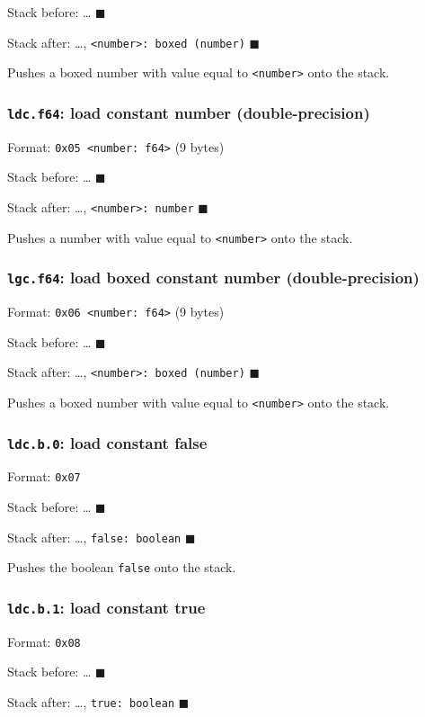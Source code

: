 Stack before: \ldots{} \(\blacksquare\)

Stack after: \ldots{}, \texttt{<number>: boxed (number)} \(\blacksquare\)

Pushes a boxed number with value equal to \texttt{<number>} onto the stack.

\subsubsection{\texttt{ldc.f64}: load constant number (double-precision)}
\label{sec:org6bba761}
Format: \texttt{0x05 <number: f64>} (9 bytes)

Stack before: \ldots{} \(\blacksquare\)

Stack after: \ldots{}, \texttt{<number>: number} \(\blacksquare\)

Pushes a number with value equal to \texttt{<number>} onto the stack.

\subsubsection{\texttt{lgc.f64}: load boxed constant number (double-precision)}
\label{sec:orgae88789}
Format: \texttt{0x06 <number: f64>} (9 bytes)

Stack before: \ldots{} \(\blacksquare\)

Stack after: \ldots{}, \texttt{<number>: boxed (number)} \(\blacksquare\)

Pushes a boxed number with value equal to \texttt{<number>} onto the stack.

\subsubsection{\texttt{ldc.b.0}: load constant false}
\label{sec:org628c82c}
Format: \texttt{0x07}

Stack before: \ldots{} \(\blacksquare\)

Stack after: \ldots{}, \texttt{false: boolean} \(\blacksquare\)

Pushes the boolean \texttt{false} onto the stack.

\subsubsection{\texttt{ldc.b.1}: load constant true}
\label{sec:org45a4edf}
Format: \texttt{0x08}

Stack before: \ldots{} \(\blacksquare\)

Stack after: \ldots{}, \texttt{true: boolean} \(\blacksquare\)

